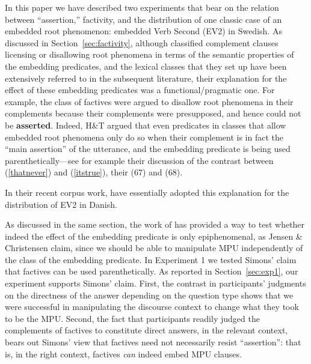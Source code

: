 \documentclass[output=paper]{LSP/langsci}
\begin{document}
In this paper we have described two experiments that bear on the relation between ``assertion,'' factivity, and the distribution of one classic case of an embedded root phenomenon: embedded Verb Second (EV2) in Swedish. As discussed in Section~\ref{sec:factivity}, although \cite{hooper-thompson73}  classified complement clauses licensing or disallowing root phenomena in terms of the semantic properties of the embedding predicates, and the lexical classes that they set up have been extensively referred to in the subsequent literature, their explanation for the effect of these embedding predicates was a functional/pragmatic one. For example, the class of factives were argued to disallow root phenomena in their complements because their complements were presupposed, and hence could not be \textbf{asserted}. Indeed, H\&T argued that even predicates in classes that allow embedded root phenomena only do so when their complement is in fact the ``main assertion'' of the utterance, and the embedding predicate is being used parenthetically---see for example their discussion of the contrast between (\ref{thatnever}) and (\ref{itstrue}), their (67) and (68).%
\begin{exe}
	\ex \begin{xlist}
		\label{thatnever}
		\label{itstrue}
	\end{xlist} 
\end{exe}

In their recent corpus work, \cite{jensen-christensen13} have essentially adopted this explanation for the distribution of EV2 in Danish.

As discussed in the same section, the work of \cite{simons07} has provided a way to 
test whether indeed the effect of the embedding predicate is only epiphenomenal, as Jensen \& Christensen claim, since we should be able to manipulate MPU independently of the class of the embedding predicate. 
In Experiment 1 we tested Simons' claim that factives can be used parenthetically.  As reported in Section~\ref{sec:exp1}, our experiment supports Simons' claim.   First, the contrast in participants' judgments on the directness of the answer depending on the question type shows that we were successful in manipulating the discourse context to change what they took to be the MPU. Second, the fact that participants readily judged the complements of factives to constitute direct answers, in the relevant context, bears out Simons' view that factives need not necessarily resist ``assertion'': that is, in the right context, factives \textit{can} indeed embed MPU clauses.
\end{document}
